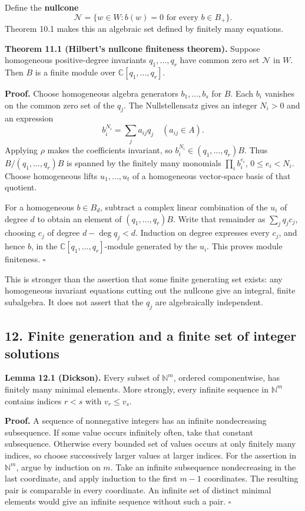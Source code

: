 \documentclass[
]{article}
\begin{document}
Define the \textbf{nullcone} \[
\mathcal N=\{w\in W:b(w)=0\text{ for every }b\in B_+\}.
\] Theorem 10.1 makes this an algebraic set defined by finitely many
equations.

\protect{}\label{theorem-11-1}{}

\textbf{Theorem 11.1 (Hilbert's nullcone finiteness theorem).} Suppose
homogeneous positive-degree invariants \(q_1,\ldots,q_r\) have common
zero set \(\mathcal N\) in \(W\). Then \(B\) is a finite module over
\(\mathbb C [q_1,\ldots,q_r]\).

\textbf{Proof.} Choose homogeneous algebra generators \(b_1,\ldots,b_s\)
for \(B\). Each \(b_i\) vanishes on the common zero set of the \(q_j\).
The Nullstellensatz gives an integer \(N_i>0\) and an expression \[
b_i^{N_i}=\sum_j a_{ij}q_j\quad(a_{ij}\in A).
\] Applying \(\rho\) makes the coefficients invariant, so
\(b_i^{N_i}\in(q_1,\ldots,q_r)B\). Thus \(B/(q_1,\ldots,q_r)B\) is
spanned by the finitely many monomials \(\prod_i b_i^{e_i}\),
\(0\leq e_i<N_i\). Choose homogeneous lifts \(u_1,\ldots,u_t\) of a
homogeneous vector-space basis of that quotient.

For a homogeneous \(b\in B_d\), subtract a complex linear combination of
the \(u_i\) of degree \(d\) to obtain an element of
\((q_1,\ldots,q_r)B\). Write that remainder as \(\sum_jq_jc_j\),
choosing \(c_j\) of degree \(d-\deg q_j<d\). Induction on degree
expresses every \(c_j\), and hence \(b\), in the
\(\mathbb C [q_1,\ldots,q_r]\)-module generated by the \(u_i\). This
proves module finiteness. \(\square\)

This is stronger than the assertion that some finite generating set
exists: any homogeneous invariant equations cutting out the nullcone
give an integral, finite subalgebra. It does not assert that the \(q_j\)
are algebraically independent.

\subsection{12. Finite generation and a finite set of integer
solutions}\label{section-12}

\protect{}\label{lemma-12-1}{}

\textbf{Lemma 12.1 (Dickson).} Every subset of \(\mathbb N^m\), ordered
componentwise, has finitely many minimal elements. More strongly, every
infinite sequence in \(\mathbb N^m\) contains indices \(r<s\) with
\(v_r\leq v_s\).

\textbf{Proof.} A sequence of nonnegative integers has an infinite
nondecreasing subsequence. If some value occurs infinitely often, take
that constant subsequence. Otherwise every bounded set of values occurs
at only finitely many indices, so choose successively larger values at
larger indices. For the assertion in \(\mathbb N^m\), argue by induction
on \(m\). Take an infinite subsequence nondecreasing in the last
coordinate, and apply induction to the first \(m-1\) coordinates. The
resulting pair is comparable in every coordinate. An infinite set of
distinct minimal elements would give an infinite sequence without such a
pair. \(\square\)
\end{document}

